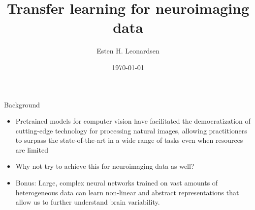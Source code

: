 \documentclass{beamer}
\title{Transfer learning for neuroimaging data}
\author{Esten H. Leonardsen}
\date{\today}
\begin{document}
	\begin{frame}
	 	\titlepage
	\end{frame}

	\begin{frame}{Background}
		\begin{itemize}
			\item Pretrained models for computer vision have facilitated the democratization of cutting-edge technology for processing natural images, allowing practitioners to surpass the state-of-the-art in a wide range of tasks even when resources are limited
			\item[\textrightarrow] Why not try to achieve this for neuroimaging data as well?
			\item Bonus: Large, complex neural networks trained on vast amounts of heterogeneous data can learn non-linear and abstract representations that allow us to further understand brain variability.
		\end{itemize}
	\end{frame}

	\newcommand{\datasettrace}[4]{
		\def\tracesex{#1}
		\def\tracesign{#2}
		\def\currentdataset{#3}
		\def\previousdataset{#4}

		\addplot[
			draw=none,
			line width=0pt,
			name path=trace-#1-#3
		] table [
			x=age,
			y expr=#2 * \thisrow{#1_#3}
		]{\data};

		\addplot[
			fill=#3!50
		] fill between [
			of=trace-#1-#3 and trace-#1-#4
		];
	}

	\newcommand{\datasetnode}[4]{
		\node[
			circle,
			anchor=#3,
			draw=#1,
			fill=#1!50,
			label={[text depth=0]right:\scriptsize{#1}},
			inner sep=1.75pt,
			text depth=0
		] (#4) at #2 {};
	}
\end{document}
